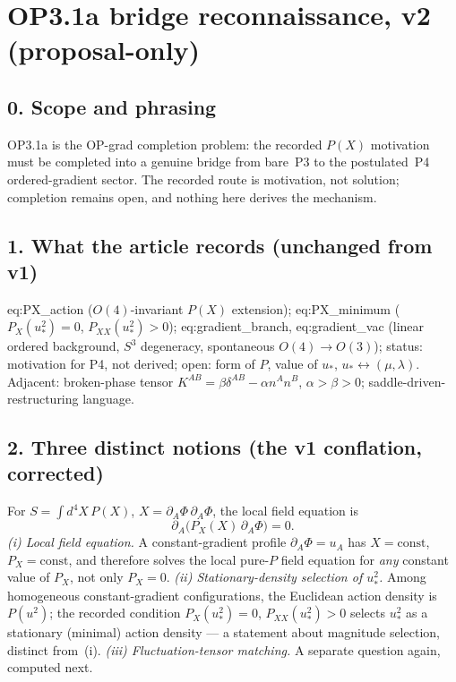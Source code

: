 \section*{OP3.1a bridge reconnaissance, v2 (proposal-only)}

\subsection*{0. Scope and phrasing}
OP3.1a is the OP-grad completion problem: the recorded $P(X)$
motivation must be completed into a genuine bridge from bare~P3 to
the postulated~P4 ordered-gradient sector.
The recorded route is motivation, not solution; completion remains
open, and nothing here derives the mechanism.

\subsection*{1. What the article records (unchanged from v1)}
eq:PX\_action ($O(4)$-invariant $P(X)$ extension);
eq:PX\_minimum ($P_X(u_*^2)=0$, $P_{XX}(u_*^2)>0$);
eq:gradient\_branch, eq:gradient\_vac (linear ordered background,
$S^3$ degeneracy, spontaneous $O(4)\to O(3)$); status: motivation
for P4, not derived; open: form of $P$, value of $u_*$,
$u_*\leftrightarrow(\mu,\lambda)$.
Adjacent: broken-phase tensor $K^{AB}=\beta\delta^{AB}-\alpha
n^An^B$, $\alpha>\beta>0$; saddle-driven-restructuring language.

\subsection*{2. Three distinct notions (the v1 conflation,
corrected)}
For $S=\int d^4X\,P(X)$, $X=\partial_A\Phi\,\partial_A\Phi$, the
local field equation is
\[
\partial_A\bigl(P_X(X)\,\partial_A\Phi\bigr)=0 .
\]
\emph{(i) Local field equation.}
A constant-gradient profile $\partial_A\Phi=u_A$ has
$X=\mathrm{const}$, $P_X=\mathrm{const}$, and therefore solves the
local pure-$P$ field equation for \emph{any} constant value of
$P_X$, not only $P_X=0$.
\emph{(ii) Stationary-density selection of $u_*^2$.}
Among homogeneous constant-gradient configurations, the Euclidean
action density is $P(u^2)$; the recorded condition
$P_X(u_*^2)=0$, $P_{XX}(u_*^2)>0$ selects $u_*^2$ as a stationary
(minimal) action density --- a statement about magnitude
selection, distinct from~(i).
\emph{(iii) Fluctuation-tensor matching.}
A separate question again, computed next.

